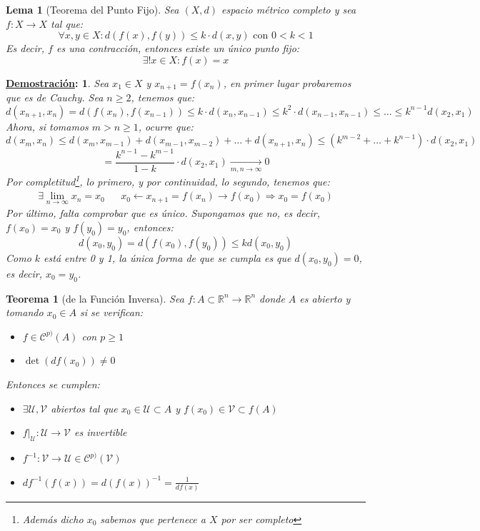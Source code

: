 \documentclass[10pt,a4paper,openright]{book}
\theoremstyle{break}
\newtheorem*{theo}{Teorema}
\newtheorem*{lema}{Lema}
\newtheorem*{demo}{\underline{Demostración}:}
\begin{document}
\begin{lema}[Teorema del Punto Fijo]
Sea $(X, d)$ espacio métrico completo y sea $f : X \to X$ tal que:
$$\forall x,y \in X : d(f(x), f(y)) \leq k \cdot d(x,y) \mbox{ 	con } 0 < k <1$$
Es decir, $f$ es una contracción, entonces existe un único punto fijo:
$$\exists ! x \in X : f(x) = x$$
\end{lema}
\begin{demo}
Sea $x_1 \in X$ y $x_{n+1} = f(x_n)$, en primer lugar probaremos que es de Cauchy. Sea $n \geq 2$, tenemos que:
$$d(x_{n+1}, x_n) = d(f(x_n), f(x_{n-1})) \leq k \cdot d(x_n, x_{n-1}) \leq k^2 \cdot d(x_{n-1}, x_{n-1}) \leq \ldots \leq k^{n-1} d(x_2, x_1)$$ 
Ahora, si tomamos $m > n \geq 1$, ocurre que:
$$d(x_m, x_n) \leq d(x_m, x_{m-1}) + d(x_{m-1}, x_{m-2}) + \ldots + d(x_{n+1}, x_n) \leq (k^{m-2} + \ldots + k^{n-1}) \cdot d(x_2, x_1)$$
$$= \frac{k^{n-1} - k^{m-1}}{1 - k} \cdot d(x_2, x_1) \xrightarrow[m,n \to \infty]{} 0$$
Por completitud\footnote{Además dicho $x_0$ sabemos que pertenece a $X$ por ser completo}, lo primero, y por continuidad, lo segundo, tenemos que:
\begin{align*}
\exists \lim_{n \to \infty} x_n = x_0 & & x_0 \leftarrow x_{n+1} = f(x_n) \to f(x_0) \Rightarrow x_0 = f(x_0)
\end{align*}
Por último, falta comprobar que es único. Supongamos que no, es decir, $f(x_0) = x_0$ y $f(y_0) = y_0$, entonces:
$$d(x_0, y_0) = d(f(x_0), f(y_0)) \leq k d(x_0, y_0)$$
Como $k$ está entre 0 y 1, la única forma de que se cumpla es que $d(x_0, y_0) = 0$, es decir, $x_0 = y_0$.
\end{demo}

\begin{theo}[de la Función Inversa]
Sea $f: A \subset \mathbb{R}^n \to \mathbb{R}^n$ donde $A$ es abierto y tomando $x_0 \in A$ si se verifican:
\begin{itemize}
\item $f \in \mathcal{C}^{p)} (A)$ con $p \geq 1$
\item $\det (df(x_0)) \neq 0$
\end{itemize}
Entonces se cumplen:
\begin{itemize}
\item $\exists \mathcal{U}, \mathcal{V}$ abiertos tal que $x_0 \in \mathcal{U} \subset A$ y $f(x_0)\in \mathcal{V} \subset f(A)$

\item $f|_\mathcal{U} : \mathcal{U} \to \mathcal{V}$ es invertible
\item $f^{-1} : \mathcal{V} \to \mathcal{U} \in \mathcal{C}^{p)}(\mathcal{V})$
\item $df^{-1}(f(x)) = d(f(x))^{-1} = \frac{1}{df(x)}$
\end{itemize}
\end{theo}
\end{document}
